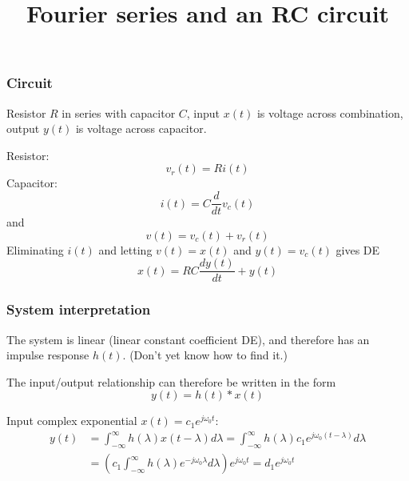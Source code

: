 \documentclass[10pt]{beamer}
\title{Fourier series and an RC circuit}
\author{}
\date{}
\newcommand{\conv}{\ast}
\begin{document}

\begin{frame}
\titlepage
\end{frame}


\begin{frame}
  \frametitle{Circuit}
  Resistor $R$ in series with capacitor $C$, input $x(t)$ is
  voltage across combination, output $y(t)$ is voltage across
  capacitor.

  Resistor:
  \begin{equation*}
    v_r(t) = R i(t)
  \end{equation*}
  Capacitor:
  \begin{equation*}
    i(t) = C \frac{d}{dt} v_c(t)
  \end{equation*}
  and
  \begin{equation*}
    v(t) = v_c(t) + v_r(t)
  \end{equation*}
  Eliminating $i(t)$ and letting $v(t) = x(t)$ and $y(t) = v_c(t)$ gives
  DE
  \begin{equation*}
    x(t) = RC \frac{dy(t)}{dt} + y(t)
  \end{equation*}
\end{frame}

\begin{frame}
  \frametitle{System interpretation}
  The system is linear (linear constant coefficient DE), and
  therefore has an impulse response $h(t)$.  (Don't yet know how to find
  it.)

  The input/output relationship can therefore be written in the
  form
  \begin{equation*}
    y(t) = h(t) \conv x(t)
  \end{equation*}

  Input complex exponential $x(t) = c_1 e^{j \omega_0 t}$:
  \begin{align*}
    y(t) &= \int_{-\infty}^{\infty} h(\lambda) x(t-\lambda)
    d\lambda = \int_{-\infty}^{\infty} h(\lambda)
    c_1 e^{j \omega_0 (t-\lambda)} d\lambda \\
    &= \left( c_1 \int_{-\infty}^{\infty} h(\lambda)
    e^{-j \omega_0 \lambda} d\lambda \right) e^{j \omega_0 t}
    = d_1 e^{j \omega_0 t}
  \end{align*}
\end{frame}
\end{document}
